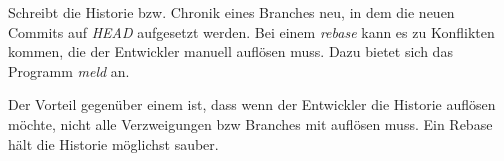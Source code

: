 \label{git-commands.advanced.rebase}
Schreibt die Historie bzw. Chronik eines Branches neu, in dem die neuen Commits auf \textit{HEAD} aufgesetzt werden. Bei einem \textit{rebase} kann es zu Konflikten kommen, die der Entwickler manuell auflösen muss. Dazu bietet sich das Programm \textit{meld} an. 

Der Vorteil gegenüber einem \textit{} ist, dass wenn der Entwickler die Historie auflösen möchte, nicht alle Verzweigungen bzw Branches mit auflösen muss. Ein Rebase hält die Historie möglichst sauber.

\label{git-commands.advanced.reset}

\label{git-commands.advanced.revert}

\label{git-commands.advanced.log}

\label{git-commands.advanced.status}

\label{git-commands.advanced.diff}